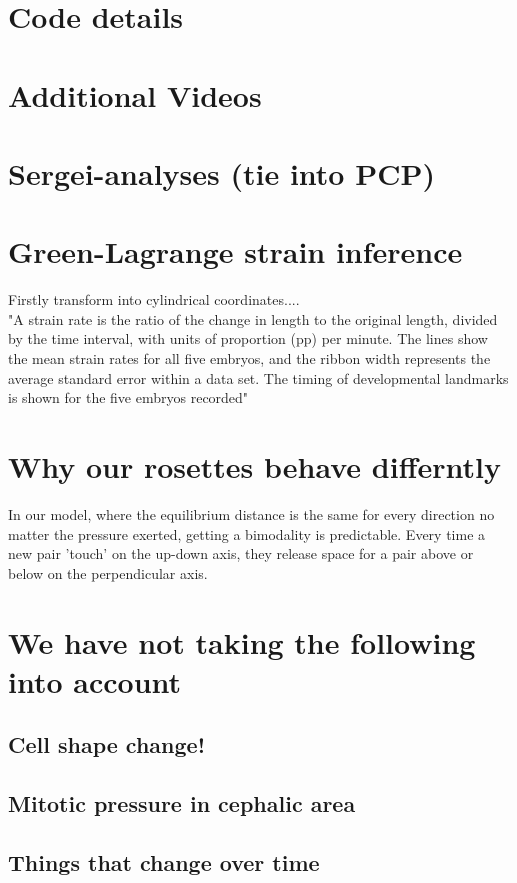 \section{Code details}
\label{App:Code}
\section{Additional Videos}
\label{App:videos}
\section{Sergei-analyses (tie into PCP)}
\label{App:Sergei}
\section{Green-Lagrange strain inference}
\label{App:Strain-Calculation}
Firstly transform into cylindrical coordinates.... \\
"A strain rate is the ratio of the change in length to the original length, divided by the time interval, with units of proportion (pp) per minute. The lines show the mean strain rates for all five embryos, and the ribbon width represents the average standard error within a data set. The timing of developmental landmarks is shown for the five embryos recorded"\cite{butler2009cell}
\section{Why our rosettes behave differntly }
\label{App:why-rosettes}
In our model, where the equilibrium distance is the same for every direction no matter the pressure exerted, getting a bimodality is predictable.
Every time a new pair 'touch' on the up-down axis, they release space for a pair above or below on the perpendicular axis. 


\section{We have not taking the following into account}
\subsection*{Cell shape change!}
\subsection*{Mitotic pressure in cephalic area}
\subsection*{Things that change over time}
